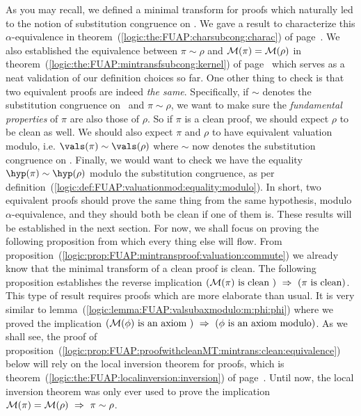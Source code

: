 As you may recall, we defined a minimal transform for proofs which
naturally led to the notion of substitution congruence on \pvs. We
gave a result to characterize this $\alpha$-equivalence in
theorem~(\ref{logic:the:FUAP:charsubcong:charac}) of
page~\pageref{logic:the:FUAP:charsubcong:charac}. We also
established the equivalence between $\pi\sim\rho$ and ${\cal
M}(\pi)={\cal M}(\rho)$ in
theorem~(\ref{logic:the:FUAP:mintransfsubcong:kernel}) of
page~\pageref{logic:the:FUAP:mintransfsubcong:kernel} which serves
as a neat validation of our definition choices so far. One other
thing to check is that two equivalent proofs are indeed {\em the
same}. Specifically, if $\sim$ denotes the substitution congruence
on \pvs\ and $\pi\sim\rho$, we want to make sure the {\em
fundamental properties} of $\pi$ are also those of $\rho$. So if
$\pi$ is a clean proof, we should expect $\rho$ to be clean as well.
We should also expect $\pi$ and $\rho$ to have equivalent valuation
modulo, i.e. $\vals(\pi)\sim\vals(\rho)$ where $\sim$ now denotes
the substitution congruence on \pv. Finally, we would want to check
we have the equality $\hyp(\pi)\sim\hyp(\rho)$ modulo the
substitution congruence, as per
definition~(\ref{logic:def:FUAP:valuationmod:equality:modulo}). In
short, two equivalent proofs should prove the same thing from the
same hypothesis, modulo $\alpha$-equivalence, and they should both
be clean if one of them is. These results will be established in the
next section. For now, we shall focus on proving the following
proposition from which every thing else will flow. From
proposition~(\ref{logic:prop:FUAP:mintransproof:valuation:commute})
we already know that  the minimal transform of a clean proof is
clean. The following proposition establishes the reverse implication
$({\cal M}(\pi)\mbox{ is clean })\ \Rightarrow\ (\pi\mbox{ is
clean})$. This type of result requires proofs which are more
elaborate than usual. It is very similar to
lemma~(\ref{logic:lemma:FUAP:valsubaxmodulo:m:phi:phi}) where we
proved the implication $({\cal M}(\phi)\mbox{ is an axiom })\
\Rightarrow\ (\phi\mbox{ is an axiom modulo})$. As we shall see, the
proof of
proposition~(\ref{logic:prop:FUAP:proofwithcleanMT:mintrans:clean:equivalence})
below will rely on the local inversion theorem for proofs, which is
theorem~(\ref{logic:the:FUAP:localinversion:inversion}) of
page~\pageref{logic:the:FUAP:localinversion:inversion}. Until now,
the local inversion theorem was only ever used to prove the
implication ${\cal M}(\pi)={\cal M}(\rho)\ \Rightarrow\
\pi\sim\rho$.


